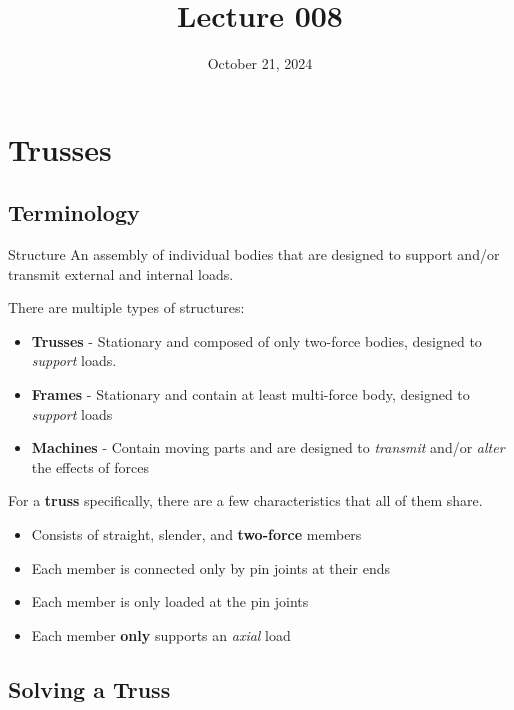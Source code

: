 \documentclass[12pt]{article}
\title{Lecture 008}
\date{October 21, 2024}
\begin{document}
\newpage
\section{Trusses}
\label{sec:trusses}

\subsection{Terminology}
\label{ssec:terminology}

\begin{definition}{Structure}
  An assembly of individual bodies that are designed to support and/or transmit external
  and internal loads.
\end{definition}

There are multiple types of structures:
\begin{itemize}
  \itemsep0em
  \item \textbf{Trusses} - Stationary and composed of only two-force bodies, designed to \textit{support} loads.
  \item \textbf{Frames} - Stationary and contain at least multi-force body, designed to \textit{support} loads
  \item \textbf{Machines} - Contain moving parts and are designed to \textit{transmit} and/or \textit{alter} the effects of forces
\end{itemize}

For a \textbf{truss} specifically, there are a few characteristics that all of them share.
\begin{itemize}
  \itemsep0em
  \item Consists of straight, slender, and \textbf{two-force} members
  \item Each member is connected only by pin joints at their ends
  \item Each member is only loaded at the pin joints
  \item Each member \textbf{only} supports an \textit{axial} load
\end{itemize}

\subsection{Solving a Truss}
\label{ssec:solvingATruss}
\end{document}
